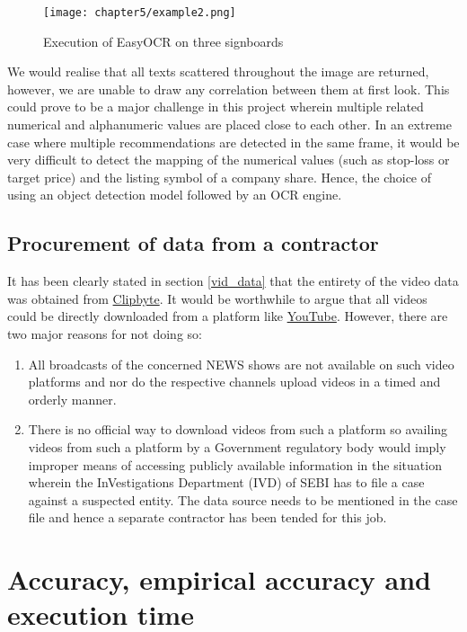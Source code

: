 \begin{figure}[h]
  \centering
  \texttt{[image: chapter5/example2.png]}
  \caption{Execution of EasyOCR on three signboards}
  \label{fig:easy_signboard}
\end{figure}

We would realise that all texts scattered throughout the image are returned, however, we are unable to draw any correlation between them at first look. This could prove to be a major challenge in this project wherein multiple related numerical and alphanumeric values are placed close to each other. In an extreme case where multiple recommendations are detected in the same frame, it would be very difficult to detect the mapping of the numerical values (such as stop-loss or target price) and the listing symbol of a company share. Hence, the choice of using an object detection model followed by an OCR engine.

\subsection{Procurement of data from a contractor}

It has been clearly stated in section \ref{vid_data} that the entirety of the video data was obtained from \href{clipbyte.com}{Clipbyte}. It would be worthwhile to argue that all videos could be directly downloaded from a platform like \href{youtube.com}{YouTube}. However, there are two major reasons for not doing so:
\begin{enumerate}
 \item All broadcasts of the concerned NEWS shows are not available on such video platforms and nor do the respective channels upload videos in a timed and orderly manner.

 \item There is no official way to download videos from such a platform so availing videos from such a platform by a Government regulatory body would imply improper means of accessing publicly available information in the situation wherein the InVestigations Department (IVD) of SEBI has to file a case against a suspected entity. The data source needs to be mentioned in the case file and hence a separate contractor has been tended for this job.

\end{enumerate}



\section{Accuracy, empirical accuracy and execution time}

